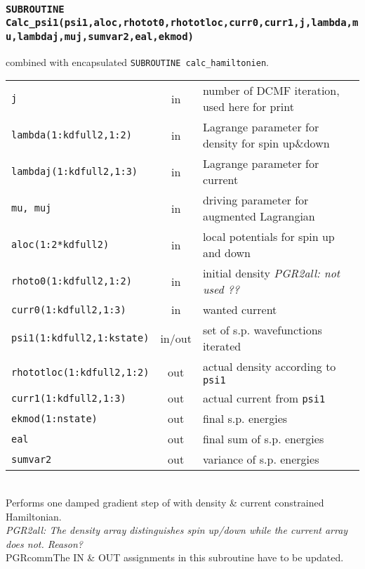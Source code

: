 \documentclass[final,1p]{elsarticle}
\newcommand{\PGRcomm}[1]{{\color{blue}\small\em PGR2all: #1}}
\begin{document}
\subsubsection*{\tt SUBROUTINE
  Calc\_psi1(psi1,aloc,rhotot0,rhototloc,curr0,curr1,j,lambda,mu,lambdaj,muj,sumvar2,eal,ekmod)}
\noindent
combined with encapsulated {\tt SUBROUTINE calc\_hamiltonien}.
\\
\begin{tabular}{lcl}
 {\tt j} & in & number of DCMF iteration, used here for print\\
 {\tt lambda(1:kdfull2,1:2)} & in & Lagrange parameter for density for
 spin up\&down\\
 {\tt lambdaj(1:kdfull2,1:3)} & in & Lagrange parameter for current\\
 {\tt mu, muj} & in & driving parameter for augmented Lagrangian\\
 {\tt aloc(1:2*kdfull2)} & in & local potentials for spin up and down\\
 {\tt rhoto0(1:kdfull2,1:2)} & in & initial density \PGRcomm{not used ??}\\
 {\tt curr0(1:kdfull2,1:3)} & in & wanted current \\
 {\tt psi1(1:kdfull2,1:kstate)} & in/out & set of s.p. wavefunctions iterated\\
 {\tt rhototloc(1:kdfull2,1:2)} & out & actual density according to {\tt psi1}\\
 {\tt curr1(1:kdfull2,1:3)} & out & actual current from {\tt psi1}\\
 {\tt ekmod(1:nstate)} & out & final s.p. energies\\
 {\tt eal} & out & final sum of s.p. energies\\
 {\tt sumvar2} & out & variance of s.p. energies\\
\end{tabular}
\\[4pt]
Performs one damped gradient step of with density \& current
constrained Hamiltonian.
\\
\PGRcomm{The density array distinguishes spin up/down while the
  current array does not. Reason?}
\\
PGRcomm{The IN \& OUT assignments in this subroutine have to be updated.}
\end{document}

